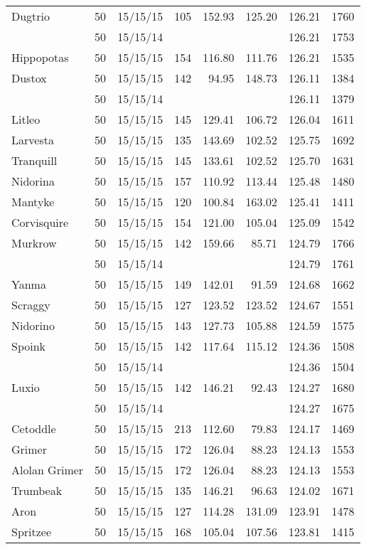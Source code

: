 \begin{longtable}{lrrrrrrr}
Dugtrio & 50 & 15/15/15 & 105 & 152.93 & 125.20 & 126.21 & 1760\\
 & 50 & 15/15/14 & & & & 126.21 & 1753\\
Hippopotas & 50 & 15/15/15 & 154 & 116.80 & 111.76 & 126.21 & 1535\\
Dustox & 50 & 15/15/15 & 142 & 94.95 & 148.73 & 126.11 & 1384\\
 & 50 & 15/15/14 & & & & 126.11 & 1379\\
Litleo & 50 & 15/15/15 & 145 & 129.41 & 106.72 & 126.04 & 1611\\
Larvesta & 50 & 15/15/15 & 135 & 143.69 & 102.52 & 125.75 & 1692\\
Tranquill & 50 & 15/15/15 & 145 & 133.61 & 102.52 & 125.70 & 1631\\
Nidorina & 50 & 15/15/15 & 157 & 110.92 & 113.44 & 125.48 & 1480\\
Mantyke & 50 & 15/15/15 & 120 & 100.84 & 163.02 & 125.41 & 1411\\
Corvisquire & 50 & 15/15/15 & 154 & 121.00 & 105.04 & 125.09 & 1542\\
Murkrow & 50 & 15/15/15 & 142 & 159.66 & 85.71 & 124.79 & 1766\\
 & 50 & 15/15/14 & & & & 124.79 & 1761\\
Yanma & 50 & 15/15/15 & 149 & 142.01 & 91.59 & 124.68 & 1662\\
Scraggy & 50 & 15/15/15 & 127 & 123.52 & 123.52 & 124.67 & 1551\\
Nidorino & 50 & 15/15/15 & 143 & 127.73 & 105.88 & 124.59 & 1575\\
Spoink & 50 & 15/15/15 & 142 & 117.64 & 115.12 & 124.36 & 1508\\
 & 50 & 15/15/14 & & & & 124.36 & 1504\\
Luxio & 50 & 15/15/15 & 142 & 146.21 & 92.43 & 124.27 & 1680\\
 & 50 & 15/15/14 & & & & 124.27 & 1675\\
Cetoddle & 50 & 15/15/15 & 213 & 112.60 & 79.83 & 124.17 & 1469\\
Grimer & 50 & 15/15/15 & 172 & 126.04 & 88.23 & 124.13 & 1553\\
Alolan Grimer & 50 & 15/15/15 & 172 & 126.04 & 88.23 & 124.13 & 1553\\
Trumbeak & 50 & 15/15/15 & 135 & 146.21 & 96.63 & 124.02 & 1671\\
Aron & 50 & 15/15/15 & 127 & 114.28 & 131.09 & 123.91 & 1478\\
Spritzee & 50 & 15/15/15 & 168 & 105.04 & 107.56 & 123.81 & 1415\\

\end{longtable}
